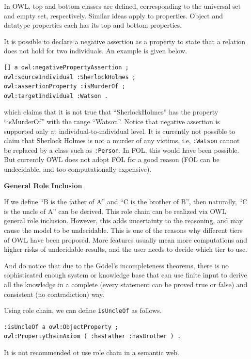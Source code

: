 In OWL, top and bottom classes are defined, corresponding to the universal set and empty set, respectively. Similar ideas apply to properties. Object and datatype properties each has its top and bottom properties.

It is possible to declare a negative assertion as a property to state that a relation does not hold for two individuals. An example is given below.
\begin{lstlisting}
[] a owl:negativePropertyAssertion ;
owl:sourceIndividual :SherlockHolmes ;
owl:assertionProperty :isMurderOf ;
owl:targetIndividual :Watson .
\end{lstlisting}
which claims that it is not true that ``SherlockHolmes'' has the property ``isMurderOf'' with the range ``Watson''. Notice that negative assertion is supported only at individual-to-individual level. It is currently not possible to claim that Sherlock Holmes is not a murder of any victims, i.e, \verb|:Watson| cannot be replaced by a class such as \verb|:Person|. In FOL, this would have been possible. But currently OWL does not adopt FOL for a good reason (FOL can be undecidable, and too computationally expensive).

\vspace{0.1in}
\noindent \textbf{General Role Inclusion}
\vspace{0.1in}

If we define ``B is the father of A'' and ``C is the brother of B'', then naturally, ``C is the uncle of A'' can be derived. This role chain can be realized via OWL general role inclusion. However, this adds uncertainty to the reasoning, and may cause the model to be undecidable. This is one of the reasons why different tiers of OWL have been proposed. More features usually mean more computations and higher risks of undecidable results, and the user needs to decide which tier to use.

And do notice that due to the G\"odel's incompleteness theorems, there is no sophisticated enough system or knowledge base that can use finite input to derive all the knowledge in a complete (every statement can be proved true or false) and consistent (no contradiction) way.

Using role chain, we can define \verb|isUncleOf| as follows.
\begin{lstlisting}
:isUncleOf a owl:ObjectProperty ;
owl:PropertyChainAxiom ( :hasFather :hasBrother ) .
\end{lstlisting}

It is not recommended ot use role chain in a semantic web.

